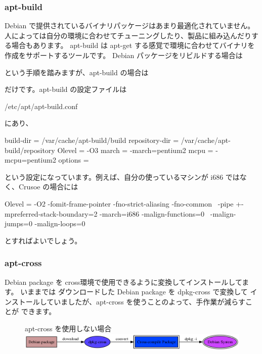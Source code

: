 \documentclass[mingoth,a4paper]{jsarticle}
\begin{document}
\subsubsection{apt-build}
 Debian で提供されているバイナリパッケージはあまり最適化されていません。
 人によっては自分の環境に合わせてチューニングしたり、製品に組み込んだりする場合もあります。
 apt-build は apt-get する感覚で環境に合わせてバイナリを作成をサポートするツールです。
 Debian パッケージをリビルドする場合は
 \begin{commandline}
 \end{commandline}
 という手順を踏みますが、apt-build の場合は
 \begin{commandline}
 \end{commandline}
 だけです。apt-build の設定ファイルは
 \begin{commandline}
 /etc/apt/apt-build.conf
 \end{commandline}
 にあり、
 \begin{commandline}
build-dir = /var/cache/apt-build/build
repository-dir = /var/cache/apt-build/repository
Olevel = -O3
march = -march=pentium2
mcpu = -mcpu=pentium2
options =
 \end{commandline}
 という設定になっています。例えば、自分の使っているマシンが i686 ではなく、Crusoe
 の場合には
\begin{commandline}
Olevel = 
-O2 -fomit-frame-pointer -fno-strict-aliasing -fno-common \ 
-pipe +-mpreferred-stack-boundary=2 -march=i686 -malign-functions=0 \
-malign-jumps=0 -malign-loops=0
\end{commandline}
とすればよいでしょう。

\subsubsection{apt-cross}
 Debian package を cross環境で使用できるように変換してインストールしてます。
 いままでは ダウンロードした Debian package を dpkg-cross で変換して
 インストールしていましたが、apt-cross を使うことのよって、手作業が減らすことが
 できます。

 \begin{figure}[h]
 \begin{center}
apt-cross を使用しない場合
 \includegraphics[width=16cm]{image200709/apt-cross.png}
 \end{center}
 \end{figure}
\end{document}
